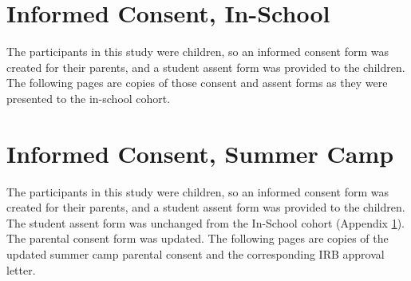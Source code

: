 % 
% 



% 
% 
% 



% 
% 

\section{Informed Consent, In-School}
\label{sec:icf:school}
The participants in this study were children, so an informed consent form was created for their parents, and a student assent form was provided to the children. The following pages are copies of those consent and assent forms as they were presented to the in-school cohort.




\section{Informed Consent, Summer Camp}
\label{sec:icf:camp}
The participants in this study were children, so an informed consent form was created for their parents, and a student assent form was provided to the children. The student assent form was unchanged from the In-School cohort (Appendix \ref{sec:icf:school}). The parental consent form was updated. The following pages are copies of the updated summer camp parental consent and the corresponding IRB approval letter.

